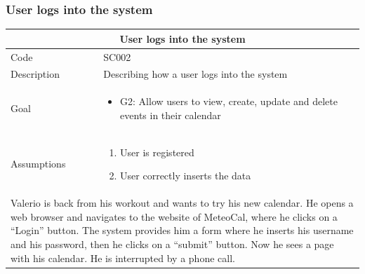 \documentclass[10pt,a4paper,titlepage]{article}
\begin{document}
\subsubsection{User logs into the system}
\begin{tabular}{| p{3cm} | p{10cm} |}
\hline \multicolumn{2}{|c|}{\textbf{User logs into the system}} \\ 
\hline Code & SC002 \\ 
\hline Description & Describing how a user logs into the system \\
\hline Goal & \begin{itemize}\item G2: Allow users to view, create, update and delete events in their calendar\end{itemize}\\
\hline Assumptions & \begin{enumerate}
\item User is registered 
\item User correctly inserts the data
\end{enumerate} \\
\hline \multicolumn{2}{|p{13cm}|}{Valerio is back from his workout and wants to try his new calendar. He opens a web browser and navigates to the website of MeteoCal, where he clicks on a “Login” button. The system provides him a form where he inserts his username and his password, then he clicks on a “submit” button. Now he sees a page with his calendar. He is interrupted by a phone call.}\\
\hline
\end{tabular}
\end{document}
